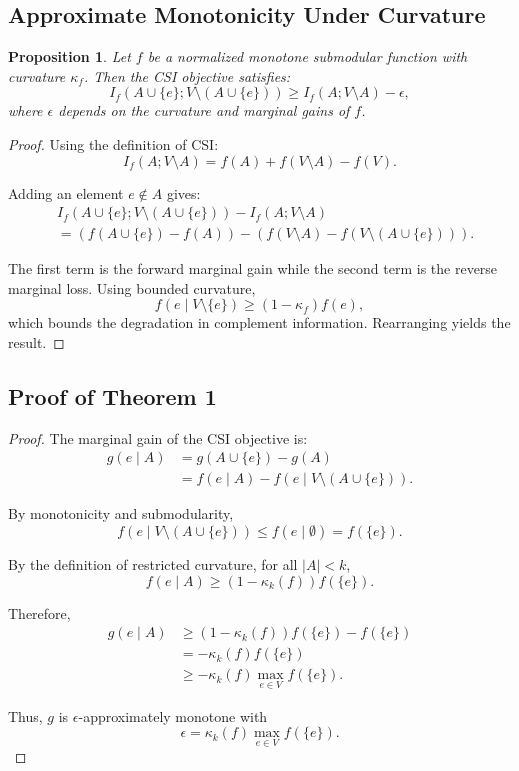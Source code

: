 \documentclass[11pt]{article}
\newtheorem{proposition}{Proposition}
\begin{document}
\subsection{Approximate Monotonicity Under Curvature}

\begin{proposition}
Let $f$ be a normalized monotone submodular function with curvature $\kappa_f$. Then the CSI objective satisfies:
\[
I_f(A\cup\{e\};V\setminus(A\cup\{e\}))
\ge
I_f(A;V\setminus A)-\epsilon,
\]
where $\epsilon$ depends on the curvature and marginal gains of $f$.
\end{proposition}

\begin{proof}
Using the definition of CSI:
\[
I_f(A;V\setminus A)
=
f(A)+f(V\setminus A)-f(V).
\]

Adding an element $e\notin A$ gives:
\begin{align}
&
I_f(A\cup\{e\};V\setminus(A\cup\{e\}))
-
I_f(A;V\setminus A)
\nonumber \\
&=
\left(
f(A\cup\{e\})-f(A)
\right)
-
\left(
f(V\setminus A)-f(V\setminus(A\cup\{e\}))
\right).
\end{align}

The first term is the forward marginal gain while the second term is the reverse marginal loss. Using bounded curvature,
\[
f(e\mid V\setminus\{e\})
\ge
(1-\kappa_f)f(e),
\]
which bounds the degradation in complement information. Rearranging yields the result.
\end{proof}

\subsection{Proof of Theorem 1}

\begin{proof}
The marginal gain of the CSI objective is:
\begin{align}
g(e\mid A)
&=
g(A\cup\{e\})-g(A) \nonumber \\
&=
f(e\mid A)
-
f(e\mid V\setminus(A\cup\{e\})).
\end{align}

By monotonicity and submodularity,
\[
f(e\mid V\setminus(A\cup\{e\}))
\le
f(e\mid \emptyset)
=
f(\{e\}).
\]

By the definition of restricted curvature, for all $|A|<k$,
\[
f(e\mid A)
\ge
(1-\kappa_k(f)) f(\{e\}).
\]

Therefore,
\begin{align}
g(e\mid A)
&\ge
(1-\kappa_k(f)) f(\{e\})
-
f(\{e\}) \nonumber \\
&=
-\kappa_k(f) f(\{e\}) \nonumber \\
&\ge
-\kappa_k(f)\max_{e\in V} f(\{e\}).
\end{align}

Thus, $g$ is $\epsilon$-approximately monotone with
\[
\epsilon
=
\kappa_k(f)\max_{e\in V} f(\{e\}).
\]
\end{proof}
\end{document}
